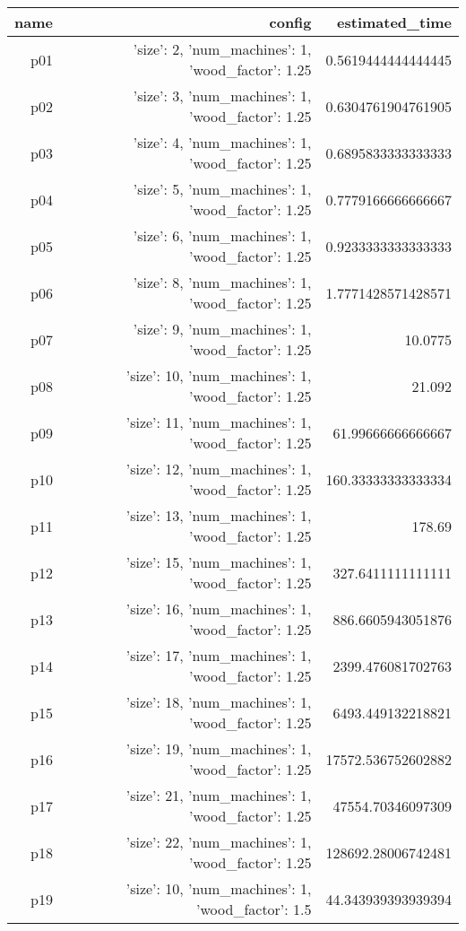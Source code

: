 \documentclass{article}
\begin{document}
                            \begin{center}
                            \scriptsize
                            \begin{tabular}{r|r|r}
                            name & config & estimated\_time\\\midrule
                              p01&{'size': 2, 'num\_machines': 1, 'wood\_factor': 1.25}&0.5619444444444445\\
  p02&{'size': 3, 'num\_machines': 1, 'wood\_factor': 1.25}&0.6304761904761905\\
  p03&{'size': 4, 'num\_machines': 1, 'wood\_factor': 1.25}&0.6895833333333333\\
  p04&{'size': 5, 'num\_machines': 1, 'wood\_factor': 1.25}&0.7779166666666667\\
  p05&{'size': 6, 'num\_machines': 1, 'wood\_factor': 1.25}&0.9233333333333333\\
  p06&{'size': 8, 'num\_machines': 1, 'wood\_factor': 1.25}&1.7771428571428571\\
  p07&{'size': 9, 'num\_machines': 1, 'wood\_factor': 1.25}&10.0775\\
  p08&{'size': 10, 'num\_machines': 1, 'wood\_factor': 1.25}&21.092\\
  p09&{'size': 11, 'num\_machines': 1, 'wood\_factor': 1.25}&61.99666666666667\\
  p10&{'size': 12, 'num\_machines': 1, 'wood\_factor': 1.25}&160.33333333333334\\
  p11&{'size': 13, 'num\_machines': 1, 'wood\_factor': 1.25}&178.69\\
  p12&{'size': 15, 'num\_machines': 1, 'wood\_factor': 1.25}&327.6411111111111\\
  p13&{'size': 16, 'num\_machines': 1, 'wood\_factor': 1.25}&886.6605943051876\\
  p14&{'size': 17, 'num\_machines': 1, 'wood\_factor': 1.25}&2399.476081702763\\
  p15&{'size': 18, 'num\_machines': 1, 'wood\_factor': 1.25}&6493.449132218821\\
  p16&{'size': 19, 'num\_machines': 1, 'wood\_factor': 1.25}&17572.536752602882\\
  p17&{'size': 21, 'num\_machines': 1, 'wood\_factor': 1.25}&47554.70346097309\\
  p18&{'size': 22, 'num\_machines': 1, 'wood\_factor': 1.25}&128692.28006742481\\
  p19&{'size': 10, 'num\_machines': 1, 'wood\_factor': 1.5}&44.343939393939394\\

\end{tabular}
\end{center}
\end{document}
